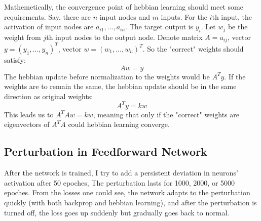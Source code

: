 \documentclass[12pt, a4paper]{article}
\begin{document}
Mathemetically, the convergence point of hebbian learning should meet some requirements. Say, there are $n$ input nodes and $m$ inputs. For the $i$th input, the activation of input nodes are $a_{i1},\dots,a_{in}$. The target output is $y_i$. Let $w_j$ be the weight from $j$th input nodes to the output node. Denote matrix $A={a_{ij}}$, vector $y=(y_1,\dots,y_n)^T$, vector $w=(w_1,\dots,w_n)^T$. So the "correct" weights should satisfy: $$Aw=y$$
The hebbian update before normalization to the weights would be $A^Ty$. If the weights are to remain the same, the hebbian update should be in the same direction as original weights: $$A^Ty=kw$$
This leads us to $A^TAw=kw$, meaning that only if the "correct" weights are eigenvectors of $A^TA$ could hebbian learning converge.

\subsection*{Perturbation in Feedforward Network}

After the network is trained, I try to add a persistent deviation in neurons' activation after 50 epoches, The perturbation lasts for 1000, 2000, or 5000 epoches. From the losses one could see, the network adapts to the perturbation quickly (with both backprop and hebbian learning), and after the perturbation is turned off, the loss goes up suddenly but gradually goes back to normal.
\end{document}
